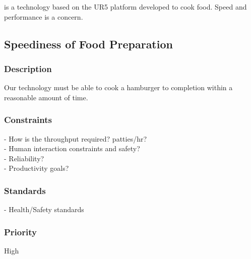 \productname{} is a technology based on the UR5 platform developed to cook food. Speed and performance is a concern. 

\subsection{Speediness of Food Preparation}
\subsubsection{Description}
Our technology must be able to cook a hamburger to completion within a reasonable amount of time.
\subsubsection{Constraints}
- How is the throughput required? patties/hr?\\
- Human interaction constraints and safety?\\
- Reliability? \\
- Productivity goals?
\subsubsection{Standards}
- Health/Safety standards\\
\subsubsection{Priority}
High


